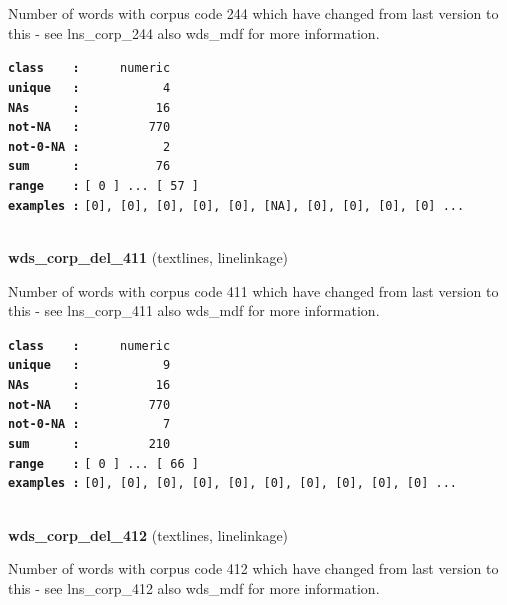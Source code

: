 \documentclass[]{article}
\begin{document}
Number of words with corpus code 244 which have changed from last
version to this - see lns\_corp\_244 also wds\_mdf for more information.

\textbf{\texttt{class\ \ \ \ :}} \texttt{~~~~~numeric}\\
\textbf{\texttt{unique\ \ \ :}} \texttt{~~~~~~~~~~~4}\\
\textbf{\texttt{NAs\ \ \ \ \ \ :}} \texttt{~~~~~~~~~~16}\\
\textbf{\texttt{not-NA\ \ \ :}} \texttt{~~~~~~~~~770}\\
\textbf{\texttt{not-0-NA\ :}} \texttt{~~~~~~~~~~~2}\\
\textbf{\texttt{sum\ \ \ \ \ \ :}} \texttt{~~~~~~~~~~76}\\
\textbf{\texttt{range\ \ \ \ :}}
\texttt{{[}\ 0\ {]}\ ...\ {[}\ 57\ {]}}\\
\textbf{\texttt{examples\ :}}
\texttt{{[}0{]},\ {[}0{]},\ {[}0{]},\ {[}0{]},\ {[}0{]},\ {[}NA{]},\ {[}0{]},\ {[}0{]},\ {[}0{]},\ {[}0{]}\ ...}\\

~

\textbf{wds\_corp\_del\_411} (textlines, linelinkage)

Number of words with corpus code 411 which have changed from last
version to this - see lns\_corp\_411 also wds\_mdf for more information.

\textbf{\texttt{class\ \ \ \ :}} \texttt{~~~~~numeric}\\
\textbf{\texttt{unique\ \ \ :}} \texttt{~~~~~~~~~~~9}\\
\textbf{\texttt{NAs\ \ \ \ \ \ :}} \texttt{~~~~~~~~~~16}\\
\textbf{\texttt{not-NA\ \ \ :}} \texttt{~~~~~~~~~770}\\
\textbf{\texttt{not-0-NA\ :}} \texttt{~~~~~~~~~~~7}\\
\textbf{\texttt{sum\ \ \ \ \ \ :}} \texttt{~~~~~~~~~210}\\
\textbf{\texttt{range\ \ \ \ :}}
\texttt{{[}\ 0\ {]}\ ...\ {[}\ 66\ {]}}\\
\textbf{\texttt{examples\ :}}
\texttt{{[}0{]},\ {[}0{]},\ {[}0{]},\ {[}0{]},\ {[}0{]},\ {[}0{]},\ {[}0{]},\ {[}0{]},\ {[}0{]},\ {[}0{]}\ ...}\\

~

\textbf{wds\_corp\_del\_412} (textlines, linelinkage)

Number of words with corpus code 412 which have changed from last
version to this - see lns\_corp\_412 also wds\_mdf for more information.
\end{document}
